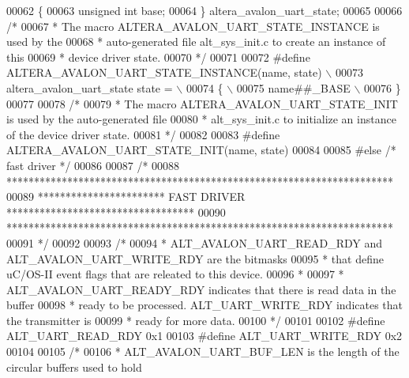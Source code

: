 \begin{DoxyCode}
00062 \{
00063     \textcolor{keywordtype}{unsigned} \textcolor{keywordtype}{int}        base;
00064 \} altera_avalon_uart_state;
00065 
00066 \textcolor{comment}{/*}
00067 \textcolor{comment}{ * The macro ALTERA\_AVALON\_UART\_STATE\_INSTANCE is used by the }
00068 \textcolor{comment}{ * auto-generated file alt\_sys\_init.c to create an instance of this }
00069 \textcolor{comment}{ * device driver state.}
00070 \textcolor{comment}{ */}
00071 
00072 \textcolor{preprocessor}{#define ALTERA\_AVALON\_UART\_STATE\_INSTANCE(name, state)   \(\backslash\)}
00073 \textcolor{preprocessor}{  altera\_avalon\_uart\_state state =                  \(\backslash\)}
00074 \textcolor{preprocessor}{    \{                                               \(\backslash\)}
00075 \textcolor{preprocessor}{      name##\_BASE                                   \(\backslash\)}
00076 \textcolor{preprocessor}{    \}}
00077 
00078 \textcolor{comment}{/*}
00079 \textcolor{comment}{ * The macro ALTERA\_AVALON\_UART\_STATE\_INIT is used by the auto-generated file}
00080 \textcolor{comment}{ * alt\_sys\_init.c to initialize an instance of the device driver state.}
00081 \textcolor{comment}{ */}
00082 
00083 \textcolor{preprocessor}{#define ALTERA\_AVALON\_UART\_STATE\_INIT(name, state)}
00084 
00085 \textcolor{preprocessor}{#else }\textcolor{comment}{/* fast driver */}\textcolor{preprocessor}{}
00086 
00087 \textcolor{comment}{/*}
00088 \textcolor{comment}{ **********************************************************************}
00089 \textcolor{comment}{ *********************** FAST DRIVER **********************************}
00090 \textcolor{comment}{ **********************************************************************}
00091 \textcolor{comment}{ */}
00092 
00093 \textcolor{comment}{/*}
00094 \textcolor{comment}{ * ALT\_AVALON\_UART\_READ\_RDY and ALT\_AVALON\_UART\_WRITE\_RDY are the bitmasks }
00095 \textcolor{comment}{ * that define uC/OS-II event flags that are releated to this device.}
00096 \textcolor{comment}{ *}
00097 \textcolor{comment}{ * ALT\_AVALON\_UART\_READY\_RDY indicates that there is read data in the buffer }
00098 \textcolor{comment}{ * ready to be processed. ALT\_UART\_WRITE\_RDY indicates that the transmitter is}
00099 \textcolor{comment}{ * ready for more data.}
00100 \textcolor{comment}{ */}
00101 
00102 \textcolor{preprocessor}{#define ALT\_UART\_READ\_RDY  0x1}
00103 \textcolor{preprocessor}{#define ALT\_UART\_WRITE\_RDY 0x2}
00104 
00105 \textcolor{comment}{/*}
00106 \textcolor{comment}{ * ALT\_AVALON\_UART\_BUF\_LEN is the length of the circular buffers used to hold}

\end{DoxyCode}
